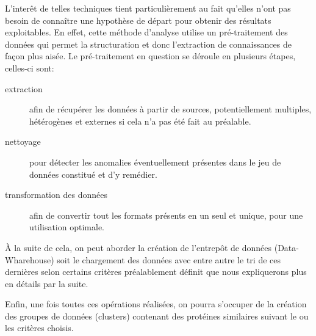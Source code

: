 L'inter\^et de telles techniques tient particulièrement au fait qu'elles n'ont pas besoin de connaître une hypothèse de départ pour obtenir des résultats exploitables. En effet, cette méthode d'analyse utilise un pré-traitement des données qui permet la structuration et donc l'extraction de connaissances de façon plus aisée. Le pré-traitement en question se déroule en plusieurs étapes, celles-ci sont:
\begin{description}
\item[extraction] afin de récupérer les données à partir de sources, potentiellement multiples, hétérogènes et externes si cela n'a pas été fait au préalable.
\item[nettoyage] pour détecter les anomalies éventuellement présentes dans le jeu de données constitué et d'y remédier.
\item[transformation des données] afin de convertir tout les formats présents en un seul et unique, pour une utilisation optimale.
\end{description}

À la suite de cela, on peut aborder la création de l'entrepôt de données (Data-Wharehouse) soit le chargement des données avec entre autre le tri de ces dernières selon certains critères préalablement définit que nous expliquerons plus en détails par la suite.

Enfin, une fois toutes ces opérations réalisées, on pourra s'occuper de la création des groupes de données (clusters) contenant des protéines similaires suivant le ou les critères choisis.
